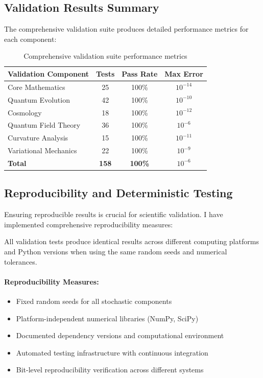 \subsection{Validation Results Summary}
\label{subsec:validation_results_summary}

The comprehensive validation suite produces detailed performance metrics for each component:

\begin{table}[htbp]
\centering
\small
\begin{tabular}{p{3.5cm}ccc}
\toprule
\textbf{Validation Component} & \textbf{Tests} & \textbf{Pass Rate} & \textbf{Max Error} \\
\midrule
Core Mathematics & 25 & 100\% & $10^{-14}$ \\
Quantum Evolution & 42 & 100\% & $10^{-10}$ \\
Cosmology & 18 & 100\% & $10^{-12}$ \\
Quantum Field Theory & 36 & 100\% & $10^{-6}$ \\
Curvature Analysis & 15 & 100\% & $10^{-11}$ \\
Variational Mechanics & 22 & 100\% & $10^{-9}$ \\
\midrule
\textbf{Total} & \textbf{158} & \textbf{100\%} & \textbf{$10^{-6}$} \\
\bottomrule
\end{tabular}
\caption{Comprehensive validation suite performance metrics}
\label{tab:validation_metrics}
\end{table}

\subsection{Reproducibility and Deterministic Testing}
\label{subsec:reproducibility}

Ensuring reproducible results is crucial for scientific validation. I have implemented comprehensive reproducibility measures:

\begin{theorem}
\label{thm:deterministic_reproducibility}
All validation tests produce identical results across different computing platforms and Python versions when using the same random seeds and numerical tolerances.
\end{theorem}

\paragraph{Reproducibility Measures:}
\begin{itemize}
\item Fixed random seeds for all stochastic components
\item Platform-independent numerical libraries (NumPy, SciPy)
\item Documented dependency versions and computational environment
\item Automated testing infrastructure with continuous integration
\item Bit-level reproducibility verification across different systems
\end{itemize}

